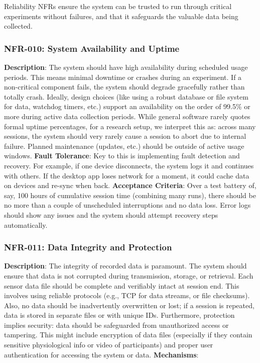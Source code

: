 \documentclass[11pt,a4paper]{report}
\begin{document}
Reliability NFRs ensure the system can be trusted to run through critical experiments without failures, and that it safeguards the valuable data being collected. \subsubsection*{NFR-010: System Availability and Uptime}
\textbf{Description}: The system should have high availability during scheduled usage periods. This means minimal downtime or crashes during an experiment. If a non-critical component fails, the system should degrade gracefully rather than totally crash. Ideally, design choices (like using a robust database or file system for data, watchdog timers, etc.) support an availability on the order of 99.5\% or more during active data collection periods. While general software rarely quotes formal uptime percentages, for a research setup, we interpret this as: across many sessions, the system should very rarely cause a session to abort due to internal failure. Planned maintenance (updates, etc.) should be outside of active usage windows. \textbf{Fault Tolerance}: Key to this is implementing fault detection and recovery. For example, if one device disconnects, the system logs it and continues with others. If the desktop app loses network for a moment, it could cache data on devices and re-sync when back. \textbf{Acceptance Criteria}: Over a test battery of, say, 100 hours of cumulative session time (combining many runs), there should be no more than a couple of unscheduled interruptions and no data loss. Error logs should show any issues and the system should attempt recovery steps automatically. \subsubsection*{NFR-011: Data Integrity and Protection}
\textbf{Description}: The integrity of recorded data is paramount. The system should ensure that data is not corrupted during transmission, storage, or retrieval. Each sensor data file should be complete and verifiably intact at session end. This involves using reliable protocols (e.g., TCP for data streams, or file checksums). Also, no data should be inadvertently overwritten or lost; if a session is repeated, data is stored in separate files or with unique IDs. Furthermore, protection implies security: data should be safeguarded from unauthorized access or tampering. This might include encryption of data files (especially if they contain sensitive physiological info or video of participants) and proper user authentication for accessing the system or data. \textbf{Mechanisms}:
\end{document}
